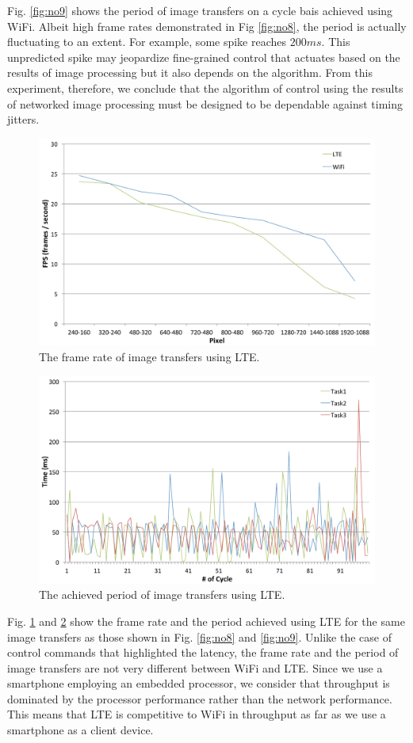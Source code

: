 Fig. \ref{fig:no9} shows the period of image transfers on a cycle bais
achieved using WiFi.
Albeit high frame rates demonstrated in Fig \ref{fig:no8}, the period is
actually fluctuating to an extent.
For example, some spike reaches $200ms$.
This unpredicted spike may jeopardize fine-grained control that actuates
based on the results of image processing but it also depends on the
algorithm.
From this experiment, therefore, we conclude that the algorithm of
control using the results of networked image processing must be designed
to be dependable against timing jitters.

\begin{figure}[!t]
 \centering
 \includegraphics[width=0.8\hsize]{fig/No10_TIPiC_FPS_graph_LTE.pdf}
 \caption{The frame rate of image transfers using LTE.}
 \label{fig:no10}
\end{figure}

\begin{figure}[!t]
 \centering
 \includegraphics[width=0.8\hsize]{fig/No11_TIPiC_serv_cycle_LTE.pdf}
 \caption{The achieved period of image transfers using LTE.}
 \label{fig:no11}
\end{figure}

Fig. \ref{fig:no10} and \ref{fig:no11} show the frame rate and the
period achieved using LTE for the same image transfers as those shown in
Fig. \ref{fig:no8} and \ref{fig:no9}.
Unlike the case of control commands that highlighted the latency, the
frame rate and the period of image transfers are not very different
between WiFi and LTE.
Since we use a smartphone employing an embedded processor, we consider
that throughput is dominated by the processor performance rather than
the network performance.
This means that LTE is competitive to WiFi in throughput as far as we
use a smartphone as a client device.

